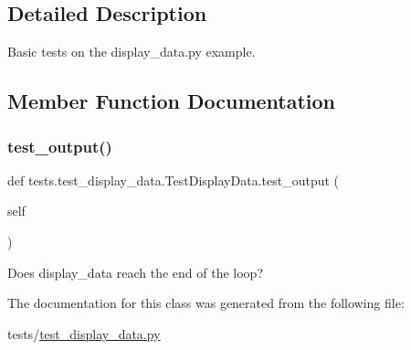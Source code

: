 \subsection{Detailed Description}
\begin{DoxyVerb}Basic tests on the display_data.py example.
\end{DoxyVerb}
 

\subsection{Member Function Documentation}
\mbox{\label{classtests_1_1test__display__data_1_1TestDisplayData_ad9482f68927957ca12e22f14b5b096a0}} 
\subsubsection{\texorpdfstring{test\+\_\+output()}{test\_output()}}
{\footnotesize\ttfamily def tests.\+test\+\_\+display\+\_\+data.\+Test\+Display\+Data.\+test\+\_\+output (\begin{DoxyParamCaption}\item[{}]{self }\end{DoxyParamCaption})}

\begin{DoxyVerb}Does display_data reach the end of the loop?
\end{DoxyVerb}
 

The documentation for this class was generated from the following file\+:\begin{DoxyCompactItemize}
\item 
tests/\hyperlink{test__display__data_8py}{test\+\_\+display\+\_\+data.\+py}\end{DoxyCompactItemize}
